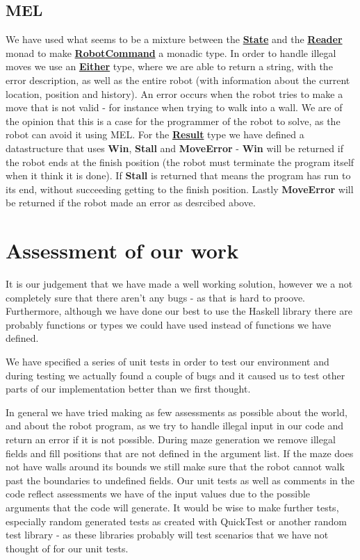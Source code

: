 \documentclass{article}
\newcommand{\datatype}[1]{\underline{\textbf{#1}}}
\newcommand{\direction}[1]{\textbf{#1}}
\begin{document}
\subsection{MEL}
We have used what seems to be a mixture between the \datatype{State} and the 
\datatype{Reader} monad to make \datatype{RobotCommand} a monadic type. 
In order to handle illegal moves we use an \datatype{Either} type, 
where we are able to return a string, with the error description, 
as well as the entire robot (with information about the current location, 
position and history).
An error occurs when the robot tries to make a move that is not valid - 
for instance when trying to walk into a wall. 
We are of the opinion that this is a case for the programmer of the robot to solve, 
as the robot can avoid it using MEL.
For the \datatype{Result} type we have defined a datastructure that uses \direction{Win}, \direction{Stall} and \direction{MoveError} - \direction{Win} will be returned if the robot ends at the finish position (the robot must terminate the program itself when it think it is done). If \direction{Stall} is returned that means the program has run to its end, without succeeding getting to the finish position. Lastly \direction{MoveError} will be returned if the robot made an error as desrcibed above.

\section{Assessment of our work}
It is our judgement that we have made a well working solution, however we a not completely sure that there aren't any bugs - as that is hard to proove. Furthermore, although we have done our best to use the Haskell library there are probably functions or types we could have used instead of functions we have defined.

We have specified a series of unit tests in order to test our environment and during testing we actually found a couple of bugs and it caused us to test other parts of our implementation better than we first thought. 

In general we have tried making as few assessments as possible about the world, and about the robot program, as we try to handle illegal input in our code and return an error if it is not possible.
During maze generation we remove illegal fields and fill positions that are not defined in the argument list. If the maze does not have walls around its bounds we still make sure that the robot cannot walk past the boundaries to undefined fields.
Our unit tests as well as comments in the code reflect assessments we have of the input values due to the possible arguments that the code will generate. It would be wise to make further tests, especially random generated tests as created with QuickTest or another random test library - as these libraries probably will test scenarios that we have not thought of for our unit tests.
\end{document}
